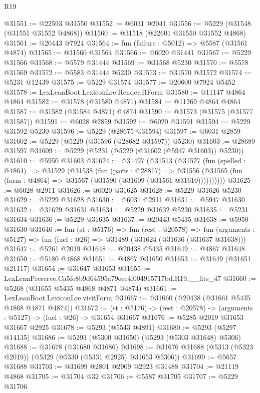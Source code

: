 \begin{lexlean}{R19}
\begin{coremodule}
@31551 := @22593 @31550
@31552 := @6031 @2041
@31556 := @5229 (@31548 (@31551 @31552 @4868))
@31560 := @31518 (@22601 @31550 @31552 @4868)
@31561 := @20443 @7924
@31564 := fun (failure : @5012) => @5587 (@31561 @4874)
@31565 := @31560 @31564
@31566 := @6020 @31441
@31567 := @5229 @31566
@31568 := @5579 @31444
@31569 := @31568 @5230
@31570 := @5578 @31569
@31572 := @5583 @31444 @5230
@31573 := @31570 @31572
@31574 := @5231 @12439
@31575 := @5229 @31574
@31577 := @20600 @7924 @5452
@31578 := LexLeanBoot.LexiconLre.Render.RForm
@31580 := @11147 @4864 @4864
@31582 := @31578 (@31580 @4871)
@31584 := @11269 @4864 @4864
@31587 := @31582 (@31584 @4871) @4874
@31590 := @31573 (@31575 (@31577 @31587))
@31591 := @6028 @2859
@31592 := @6020 @31591
@31594 := @5229 @31592 @5230
@31596 := @5229 (@28675 @31594)
@31597 := @6031 @2859
@31602 := @5229 (@5229 (@31596 (@28682 @31597)) @5230)
@31603 := @28689 @31597
@31609 := @5229 (@5231 (@5229 (@31602 (@5947 @31603)) @5230))
@31610 := @5950 @31603
@31624 := @31497
    (@31513
      (@31527
        (fun (spelled : @4864) =>
        @31529
          (@31538
            (fun (parts : @28817) =>
            @31556 (@31565 (fun (form : @4864) => @31567 (@31590 (@31609 (@31561 @31610))))))))))
@31625 := @6028 @2911
@31626 := @6020 @31625
@31628 := @5229 @31626 @5230
@31629 := @5229 @31628
@31630 := @6031 @2911
@31631 := @5947 @31630
@31632 := @31629 @31631
@31634 := @5229 @31632 @5230
@31635 := @5231 @31634
@31636 := @5229 @31635
@31637 := @20443 @5435
@31638 := @5950 @31630
@31646 := fun (st : @5176) =>
  fun (rest : @20578) =>
  fun (arguments : @5127) => fun (fuel : @26) => @31489 (@31624 (@31636 (@31637 @31638)))
@31647 := @5261 @2019
@31648 := @20438 @5435
@31649 := @4867 @31648
@31650 := @5180 @4868
@31651 := @4867 @31650
@31653 := @31649 (@31651 @21117)
@31654 := @31647 @31653
@31655 := LexLeanPreserve.Ca5fe8b9d64595a79eee4f004915717bd.R19.__fits_47
@31660 := @5268 (@31655 @5435 @4868 @4871 @4874)
@31661 := LexLeanBoot.LexiconLre.visitForm
@31667 := @31660 (@20438 (@31661 @5435 @4868 @4871 @4874))
@31672 := (st : @5176) -> (rest : @20578) -> (arguments : @5127) -> (fuel : @26) -> @31654 @31667
@31676 := @5285 @2019 @31653 @31667 @2925
@31678 := @5293 (@5543 @4891)
@31680 := @5293 (@5297 @14135)
@31686 := @5293 (@5300 @31650) (@5293 (@5303 @31648) @5306)
@31688 := @31678 (@31680 @31686)
@31698 := @31676 @31688 (@5313 (@5323 @2019)) (@5329 (@5330 (@5331 @2925) @31653 @5306))
@31699 := @5657 @31688
@31703 := @31699 @2801 @2909 @2923 @31488
@31704 := @21119 @4868
@31705 := @31704 @32
@31706 := @5587 @31705
@31707 := @5229 @31706

\end{coremodule}
\end{lexlean}
